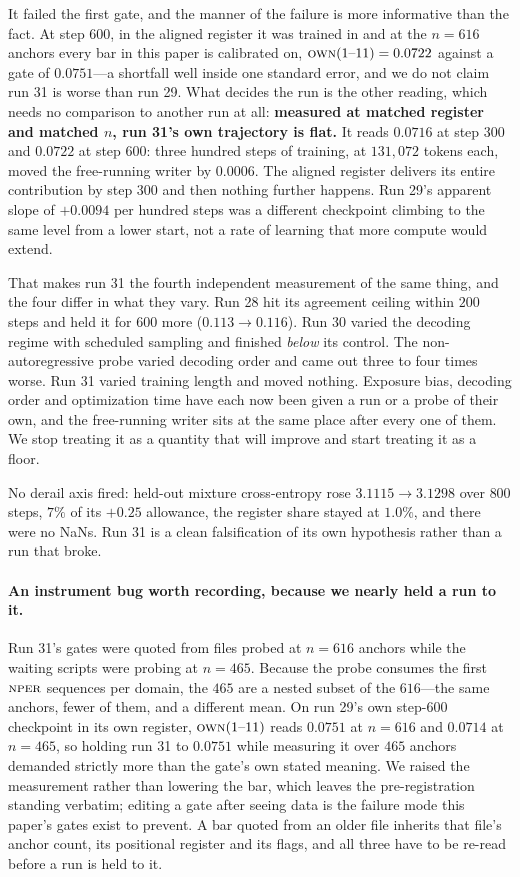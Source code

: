 \documentclass{article} %
\begin{document}
It failed the first gate, and the manner of the failure is more informative than the fact. At step
$600$, in the aligned register it was trained in and at the $n=616$ anchors every bar in this paper is
calibrated on, $\textsc{own}(1\text{--}11) = 0.0722$ against a gate of $0.0751$---a shortfall well
inside one standard error, and we do not claim run 31 is worse than run 29. What decides the run is
the other reading, which needs no comparison to another run at all: \textbf{measured at matched
register and matched $n$, run 31's own trajectory is flat.} It reads $0.0716$ at step $300$ and
$0.0722$ at step $600$: three hundred steps of training, at $131{,}072$ tokens each, moved the
free-running writer by $0.0006$. The aligned register delivers its entire contribution by step $300$
and then nothing further happens. Run 29's apparent slope of $+0.0094$ per hundred steps was a
different checkpoint climbing to the same level from a lower start, not a rate of learning that more
compute would extend.

That makes run 31 the fourth independent measurement of the same thing, and the four differ in what
they vary. Run 28 hit its agreement ceiling within $200$ steps and held it for $600$ more
($0.113 \to 0.116$). Run 30 varied the decoding regime with scheduled sampling and finished
\emph{below} its control. The non-autoregressive probe varied decoding order and came out three to
four times worse. Run 31 varied training length and moved nothing. Exposure bias, decoding order and
optimization time have each now been given a run or a probe of their own, and the free-running writer
sits at the same place after every one of them. We stop treating it as a quantity that will improve
and start treating it as a floor.

No derail axis fired: held-out mixture cross-entropy rose $3.1115 \to 3.1298$ over $800$ steps, $7\%$
of its $+0.25$ allowance, the register share stayed at $1.0\%$, and there were no NaNs. Run 31 is a
clean falsification of its own hypothesis rather than a run that broke.

\paragraph{An instrument bug worth recording, because we nearly held a run to it.} Run 31's gates were
quoted from files probed at $n=616$ anchors while the waiting scripts were probing at $n=465$. Because
the probe consumes the first $\textsc{nper}$ sequences per domain, the $465$ are a nested subset of the
$616$---the same anchors, fewer of them, and a different mean. On run 29's own step-$600$ checkpoint in
its own register, $\textsc{own}(1\text{--}11)$ reads $0.0751$ at $n=616$ and $0.0714$ at $n=465$, so
holding run 31 to $0.0751$ while measuring it over $465$ anchors demanded strictly more than the gate's
own stated meaning. We raised the measurement rather than lowering the bar, which leaves the
pre-registration standing verbatim; editing a gate after seeing data is the failure mode this paper's
gates exist to prevent. A bar quoted from an older file inherits that file's anchor count, its
positional register and its flags, and all three have to be re-read before a run is held to it.
\end{document}
